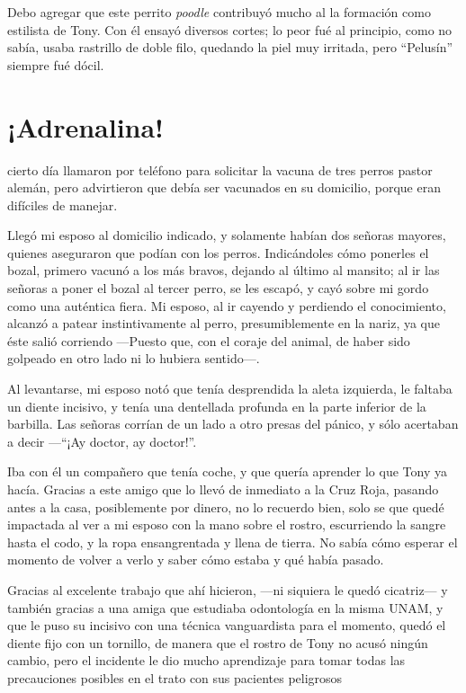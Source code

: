 \documentclass[letterpaper, 12pt]{book}
\begin{document}
Debo agregar que este perrito \textit{poodle} contribuyó mucho  al la formación como estilista de Tony. Con él ensayó diversos cortes; lo peor fué al principio, como no sabía, usaba rastrillo de doble filo, quedando la piel muy irritada, pero ``Pelusín'' siempre fué dócil.

\chapter{¡Adrenalina!}
cierto día llamaron por teléfono para solicitar la vacuna de tres perros pastor alemán, pero advirtieron que debía ser vacunados en su domicilio, porque eran difíciles de manejar.

Llegó mi esposo al domicilio indicado, y solamente habían dos señoras mayores, quienes aseguraron que podían con los perros. Indicándoles cómo ponerles el bozal, primero vacunó a los más bravos, dejando al último al mansito; al ir las señoras a poner el bozal al tercer perro, se les escapó, y cayó sobre mi gordo como una auténtica fiera. Mi esposo, al ir cayendo y perdiendo el conocimiento, alcanzó a patear instintivamente al perro, presumiblemente en la nariz, ya que éste salió corriendo ---Puesto que, con el coraje del animal, de haber sido golpeado en otro lado ni lo hubiera sentido---. 

 Al levantarse, mi esposo notó que tenía desprendida la aleta izquierda, le faltaba un diente incisivo, y tenía una dentellada profunda en la parte inferior de la barbilla. Las señoras corrían de un lado a otro presas del pánico, y sólo acertaban a decir ---``¡Ay doctor, ay doctor!''.

Iba con él un compañero que tenía coche, y que quería aprender lo que Tony ya hacía. Gracias a este amigo que lo llevó de inmediato a la Cruz Roja, pasando antes a la casa, posiblemente por dinero, no lo recuerdo bien, solo se que quedé impactada al ver a mi esposo con la mano sobre el rostro, escurriendo la sangre hasta el codo, y la ropa ensangrentada y llena de tierra.
No sabía cómo esperar el momento de volver a verlo y saber cómo estaba y qué había pasado.

Gracias al excelente trabajo que ahí hicieron, ---ni siquiera le quedó cicatriz--- y también gracias a una amiga que estudiaba odontología en la misma UNAM, y que le puso su incisivo con una técnica vanguardista para el momento, quedó el diente fijo con un tornillo, de manera que el rostro de Tony no acusó ningún  cambio, pero el incidente le dio mucho aprendizaje para tomar todas las precauciones posibles en el trato con sus pacientes peligrosos
\end{document}
